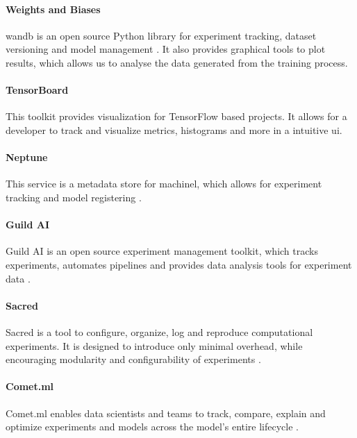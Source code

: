\paragraph{Weights and Biases}

wandb is an open source Python library for experiment tracking, dataset versioning and model management \parencite{wandb}. It also provides graphical tools to plot results, which allows us to analyse the data generated from the training process.

\paragraph{TensorBoard}

This toolkit provides visualization for TensorFlow \parencite{Tensorflow} based projects. It allows for a developer to track and visualize metrics, histograms and more in a intuitive \acrfull{ui}.

\paragraph{Neptune}

This service is a metadata store for \acrshort{machinel}, which allows for experiment tracking and model registering \parencite{neptune}.

\paragraph{Guild AI}

Guild AI is an open source experiment management toolkit, which tracks experiments, automates pipelines and provides data analysis tools for experiment data \parencite{guildai}.

\paragraph{Sacred} 

Sacred is a tool to configure, organize, log and reproduce computational experiments. It is designed to introduce only minimal overhead, while encouraging modularity and configurability of experiments \parencite{klaus_greff-proc-scipy-2017}.

\paragraph{Comet.ml}

Comet.ml enables data scientists and teams to track, compare, explain and optimize experiments and models across the model’s entire lifecycle \parencite{CometML}.

